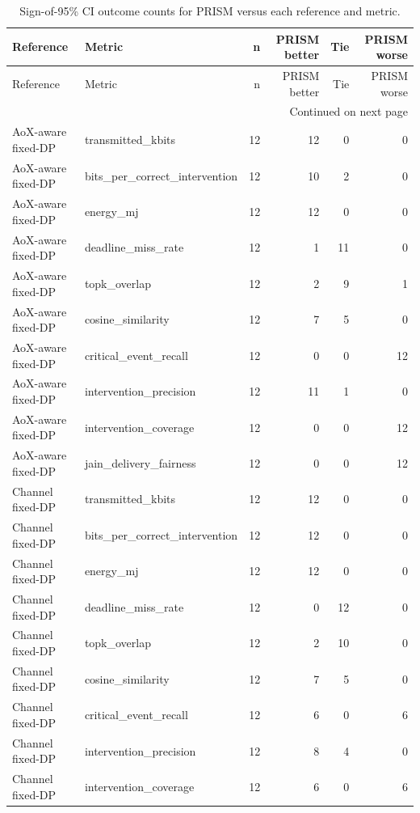 
\setlength{\tabcolsep}{3pt}
\renewcommand{\arraystretch}{1.08}
\begin{longtable}{llrrrr}
\caption{Sign-of-95\% CI outcome counts for PRISM versus each reference and metric.}\label{tab:paircounts}\\
\toprule
Reference & Metric & n & PRISM better & Tie & PRISM worse \\
\midrule
\endfirsthead
\toprule
Reference & Metric & n & PRISM better & Tie & PRISM worse \\
\midrule
\endhead
\midrule
\multicolumn{6}{r}{Continued on next page} \\
\endfoot
\bottomrule
\endlastfoot
AoX-aware fixed-DP & transmitted\_kbits & 12 & 12 & 0 & 0 \\
AoX-aware fixed-DP & bits\_per\_correct\_intervention & 12 & 10 & 2 & 0 \\
AoX-aware fixed-DP & energy\_mj & 12 & 12 & 0 & 0 \\
AoX-aware fixed-DP & deadline\_miss\_rate & 12 & 1 & 11 & 0 \\
AoX-aware fixed-DP & topk\_overlap & 12 & 2 & 9 & 1 \\
AoX-aware fixed-DP & cosine\_similarity & 12 & 7 & 5 & 0 \\
AoX-aware fixed-DP & critical\_event\_recall & 12 & 0 & 0 & 12 \\
AoX-aware fixed-DP & intervention\_precision & 12 & 11 & 1 & 0 \\
AoX-aware fixed-DP & intervention\_coverage & 12 & 0 & 0 & 12 \\
AoX-aware fixed-DP & jain\_delivery\_fairness & 12 & 0 & 0 & 12 \\
Channel fixed-DP & transmitted\_kbits & 12 & 12 & 0 & 0 \\
Channel fixed-DP & bits\_per\_correct\_intervention & 12 & 12 & 0 & 0 \\
Channel fixed-DP & energy\_mj & 12 & 12 & 0 & 0 \\
Channel fixed-DP & deadline\_miss\_rate & 12 & 0 & 12 & 0 \\
Channel fixed-DP & topk\_overlap & 12 & 2 & 10 & 0 \\
Channel fixed-DP & cosine\_similarity & 12 & 7 & 5 & 0 \\
Channel fixed-DP & critical\_event\_recall & 12 & 6 & 0 & 6 \\
Channel fixed-DP & intervention\_precision & 12 & 8 & 4 & 0 \\
Channel fixed-DP & intervention\_coverage & 12 & 6 & 0 & 6 \\

\end{longtable}
